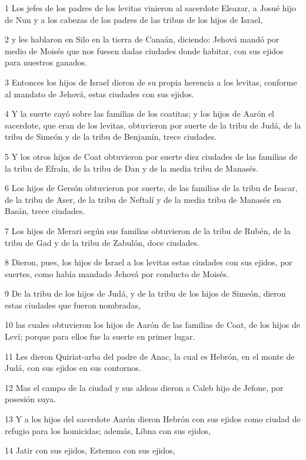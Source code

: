 \par 1 Los jefes de los padres de los levitas vinieron al sacerdote Eleazar, a Josué hijo de Nun y a los cabezas de los padres de las tribus de los hijos de Israel,
\par 2 y les hablaron en Silo en la tierra de Canaán, diciendo: Jehová mandó por medio de Moisés que nos fuesen dadas ciudades donde habitar, con sus ejidos para nuestros ganados. 
\par 3 Entonces los hijos de Israel dieron de su propia herencia a los levitas, conforme al mandato de Jehová, estas ciudades con sus ejidos.
\par 4 Y la suerte cayó sobre las familias de los coatitas; y los hijos de Aarón el sacerdote, que eran de los levitas, obtuvieron por suerte de la tribu de Judá, de la tribu de Simeón y de la tribu de Benjamín, trece ciudades.
\par 5 Y los otros hijos de Coat obtuvieron por suerte diez ciudades de las familias de la tribu de Efraín, de la tribu de Dan y de la media tribu de Manasés.
\par 6 Los hijos de Gersón obtuvieron por suerte, de las familias de la tribu de Isacar, de la tribu de Aser, de la tribu de Neftalí y de la media tribu de Manasés en Basán, trece ciudades.
\par 7 Los hijos de Merari según sus familias obtuvieron de la tribu de Rubén, de la tribu de Gad y de la tribu de Zabulón, doce ciudades.
\par 8 Dieron, pues, los hijos de Israel a los levitas estas ciudades con sus ejidos, por suertes, como había mandado Jehová por conducto de Moisés.
\par 9 De la tribu de los hijos de Judá, y de la tribu de los hijos de Simeón, dieron estas ciudades que fueron nombradas,
\par 10 las cuales obtuvieron los hijos de Aarón de las familias de Coat, de los hijos de Leví; porque para ellos fue la suerte en primer lugar.
\par 11 Les dieron Quiriat-arba del padre de Anac, la cual es Hebrón, en el monte de Judá, con sus ejidos en sus contornos.
\par 12 Mas el campo de la ciudad y sus aldeas dieron a Caleb hijo de Jefone, por posesión suya.
\par 13 Y a los hijos del sacerdote Aarón dieron Hebrón con sus ejidos como ciudad de refugio para los homicidas; además, Libna con sus ejidos,
\par 14 Jatir con sus ejidos, Estemoa con sus ejidos,
